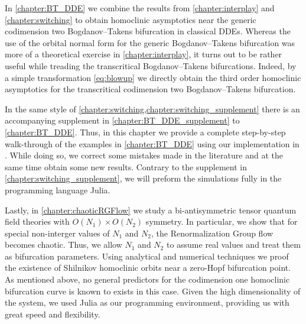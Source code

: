 In \cref{chapter:BT_DDE} we combine the results from \cref{chapter:interplay} and
\cref{chapter:switching} to obtain homoclinic asymptotics near the generic
codimension two Bogdanov--Takens bifurcation in classical DDEs. Whereas the use
of the orbital normal form for the generic Bogdanov--Takens bifurcation was more
of a theoretical exercise in \cref{chapter:interplay}, it turns out to be rather
useful while treading the transcritical Bogdanov--Takens bifurcations. Indeed, by
a simple transformation \cref{eq:blowup} we directly obtain the third order
homoclinic asymptotics for the transcritical codimension two Bogdanov--Takens
bifurcation.

In the same style of \cref{chapter:switching,chapter:switching_supplement} there
is an accompanying supplement in \cref{chapter:BT_DDE_supplement} to
\cref{chapter:BT_DDE}. Thus, in this chapter we provide a complete step-by-step
walk-through of the examples in \cref{chapter:BT_DDE} using our implementation in
\DDEBIFTOOL. While doing so, we correct some mistakes made in the literature and
at the same time obtain some new results. Contrary to the supplement in
\cref{chapter:switching_supplement}, we will preform the simulations fully in the
programming language Julia.

Lastly, in \cref{chapter:chaoticRGFlow} we study a bi-antisymmetric tensor
quantum field theories with $O(N_1)\times O(N_2)$ symmetry. In particular, we
show that for special non-interger values of $N_1$ and $N_2$, the
Renormalization Group flow becomes chaotic. Thus, we allow $N_1$ and $N_2$ to
assume real values and treat them as bifurcation parameters. Using
analytical and numerical techniques we proof the existence of
Shilnikov homoclinic orbits near a zero-Hopf bifurcation point. As mentioned
above, no general predictors for the codimension one homoclinic bifurcation
curve is known to exists  in this case. Given the high dimensionality of the system, we
used Julia as our programming environment, providing us with great speed
and flexibility.


